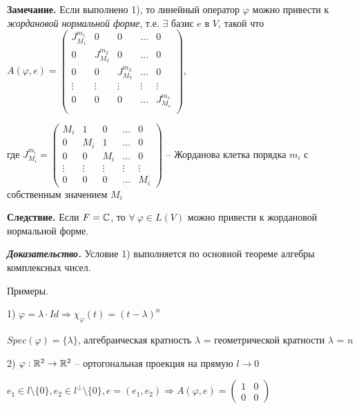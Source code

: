 \vspace{\baselineskip}
\textbf{Замечание.} Если выполнено 1), то линейный оператор $\varphi$ можно привести к \textit{жордановой нормальной форме}, т.е. $\exists$ базис $e$ в $V$, такой что $A(\varphi, e) = \left(
\begin{array}{c|c|c|c|c}
  J^{m_1}_{M_1} & 0 & 0 & \dots & 0  \\
  \hline
  0 & J^{m_2}_{M_2} & 0 & \dots & 0  \\
  \hline
  0 & 0 & J^{m_3}_{M_3} & \dots & 0 \\
  \hline
  \vdots & \vdots & \vdots & \vdots & \vdots \\
  \hline
  0 & 0 & 0 & \dots & J^{m_s}_{M_s} \\
\end{array}
\right)$,

где $J^{m_i}_{M_i} = \begin{pmatrix} M_i & 1 & 0 & \dots & 0 \\ 0 & M_i & 1 & \dots & 0 \\ 0 & 0 & M_i & \dots & 0
\\ \vdots & \vdots & \vdots & \vdots & \vdots \\ 0 & 0 & 0 & \dots & M_i \end{pmatrix}$ -- Жорданова клетка порядка $m_i$ с собственным значением $M_i$

\vspace{\baselineskip}
\textbf{Следствие.} Если $F = \mathbb{C}$, то $\forall \ \varphi \in L(V)$ можно привести к жордановой нормальной форме.

\vspace{\baselineskip}
\textbf{\textit{Доказательство.}} Условие 1) выполняется по основной теореме алгебры комплексных чисел.

\vspace{\baselineskip}
Примеры.

1) $\varphi = \lambda \cdot Id \Rightarrow \chi_{\varphi} (t) = (t - \lambda)^n$

$Spec(\varphi) = \{\lambda\}$, алгебраическая кратность $\lambda$ = геометрической кратности $\lambda$ = $n$

2) $\varphi: \mathbb{R}^2 \rightarrow \mathbb{R}^2$ -- ортогональная проекция на прямую $l \rightarrow 0$

$e_1 \in l \setminus \{0\}, e_2 \in l^{\bot} \setminus \{0\}, e = (e_1, e_2) \Rightarrow A(\varphi, e) = \begin{pmatrix} 1 & 0 \\ 0 & 0 \end{pmatrix}$


